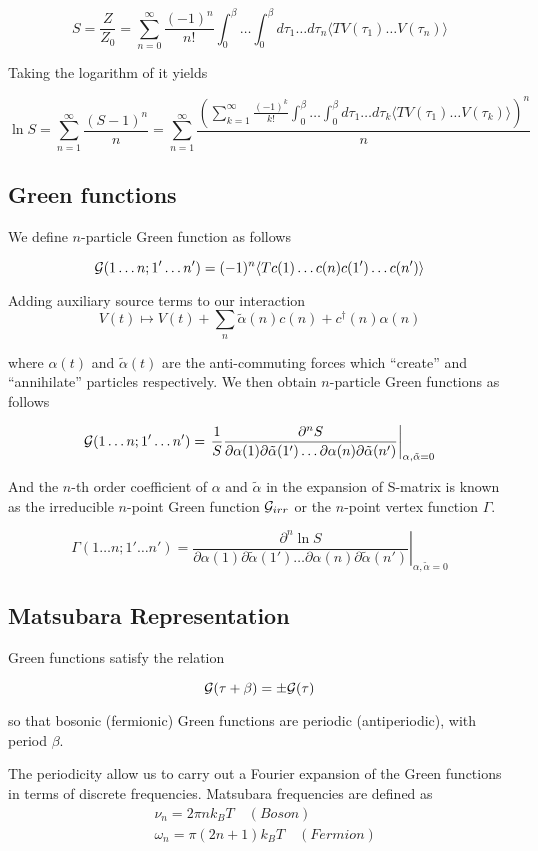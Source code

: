 \[ S = \frac{Z}{Z_0} = \sum_{n=0}^{\infty}\frac{(-1)^n}{n!}\int_{0}^{\beta}\dots\int_{0}^{\beta} d\tau_1\dots d\tau_n 
    \langle T V(\tau_1)\dots V(\tau_n) \rangle \]

Taking the logarithm of it yields

\[ \ln{S} = \sum_{n=1}^{\infty}\frac{(S-1)^n}{n} = \sum_{n=1}^{\infty}
  \frac{(\sum_{k=1}^{\infty}\frac{(-1)^k}{k!}\int_{0}^{\beta}\dots\int_{0}^{\beta} d\tau_1\dots d\tau_k 
    \langle T V(\tau_1)\dots V(\tau_k) \rangle)^n}{n} \]

\subsection{Green functions}
We define $n$-particle Green function as follows

\[ \mathcal{G}(1\dots n;1'\dots n') = (-1)^n\langle T c(1)\dots c(n)c(1')\dots c(n')\rangle \]

Adding auxiliary source terms to our interaction
\[ V(t) \mapsto V(t) + \sum_n \tilde{\alpha}(n)c(n)+c^\dagger(n) \alpha(n) \] 

where $\alpha(t)$ and $\tilde{\alpha}(t)$ are the anti-commuting forces which ``create'' and ``annihilate'' particles respectively.
We then obtain $n$-particle Green functions as follows

\[ \mathcal{G}(1\dots n;1'\dots n') = \left.\frac{1}{S}\frac{\partial^n S}{\partial\alpha(1)\partial\tilde{\alpha}(1')\dots \partial\alpha(n)\partial\tilde{\alpha}(n')}\right|_{\alpha,\tilde{\alpha}=0} \]

And the $n$-th order coefficient of $\alpha$ and $\tilde{\alpha}$ in the expansion of S-matrix
is known as the irreducible $n$-point Green function $\mathcal{G}_{irr}$ or the $n$-point vertex function $\Gamma$.

\[ \Gamma(1\dots n;1'\dots n') = \left.\frac{\partial^n \ln{S}}{\partial\alpha(1)\partial\tilde{\alpha}(1')\dots \partial\alpha(n)\partial\tilde{\alpha}(n')}\right|_{\alpha,\tilde{\alpha}=0} \]

\subsection{Matsubara Representation}
Green functions satisfy the relation

\[ \mathcal{G}(\tau+\beta) = \pm \mathcal{G}(\tau) \]

so that bosonic (fermionic) Green functions are periodic (antiperiodic), with period $\beta$.

The periodicity allow us to carry out a Fourier expansion of the Green functions in terms of discrete frequencies.
Matsubara frequencies are defined as
\begin{align*}
  & \nu_n = 2\pi n k_B T \quad (Boson) \\ 
  & \omega_n = \pi(2n+1)k_B T \quad (Fermion)
\end{align*}

